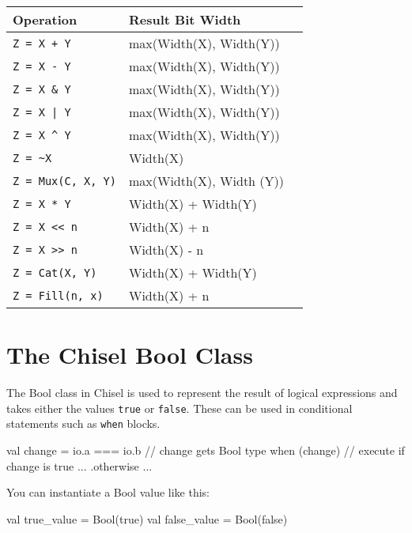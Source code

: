 \begin{center}
\begin{tabular}{| l | l | l | }
\hline
Operation & Result Bit Width \\ \hline
\verb!Z = X + Y! & max(Width(X), Width(Y))  \\ \hline
\verb+Z = X - Y+ & max(Width(X), Width(Y)) \\ \hline
\verb+Z = X & Y+ & max(Width(X), Width(Y)) \\ \hline
\verb+Z = X | Y+ & max(Width(X), Width(Y)) \\ \hline
\verb+Z = X ^ Y+ & max(Width(X), Width(Y)) \\ \hline
\verb+Z = ~X+ & Width(X) \\ \hline
\verb+Z = Mux(C, X, Y)+ & max(Width(X), Width (Y)) \\ \hline
\verb+Z = X * Y+ & Width(X) + Width(Y) \\ \hline
\verb+Z = X << n+ & Width(X) + n \\ \hline
\verb+Z = X >> n+ & Width(X) - n \\ \hline
\verb+Z = Cat(X, Y)+ & Width(X) + Width(Y) \\ \hline
\verb+Z = Fill(n, x)+ & Width(X) + n \\ \hline
\end{tabular}
\end{center}

\section{The Chisel Bool Class}

The Bool class in Chisel is used to represent the result of logical expressions and takes either the values \verb+true+ or \verb+false+. These can be used in conditional statements such as \verb+when+ blocks.

\begin{scala}
val change = io.a === io.b // change gets Bool type
when (change) { // execute if change is true
	...
} .otherwise {
	...
}
\end{scala}

You can instantiate a Bool value like this:

\begin{scala}
val true_value  = Bool(true)
val false_value = Bool(false)
\end{scala}



